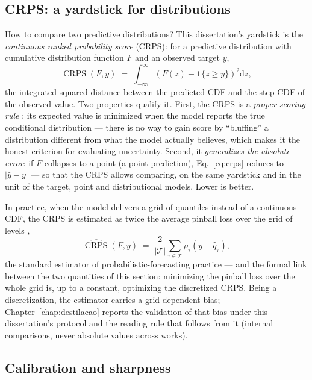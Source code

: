 \subsection{CRPS: a yardstick for distributions}

How to compare two predictive distributions? This dissertation's
yardstick is the \emph{continuous ranked probability score} (CRPS):
for a predictive distribution with cumulative distribution function
$F$ and an observed target $y$,
\begin{equation}
  \operatorname{CRPS}(F, y) \;=\;
  \int_{-\infty}^{\infty}
  \left( F(z) - \mathbf{1}\{z \geq y\} \right)^2 \mathrm{d}z,
  \label{eq:crps}
\end{equation}
the integrated squared distance between the predicted CDF and the
step CDF of the observed value. Two properties qualify it. First,
the CRPS is a \emph{proper scoring rule} \citep{gneiting2007}: its
expected value is minimized when the model reports the true
conditional distribution --- there is no way to gain score by
``bluffing'' a distribution different from what the model actually
believes, which makes it the honest criterion for evaluating
uncertainty. Second, it \emph{generalizes the absolute error}: if
$F$ collapses to a point (a point prediction), Eq.~\ref{eq:crps}
reduces to $|{\hat{y} - y}|$ --- so that the CRPS allows comparing,
on the same yardstick and in the unit of the target, point and
distributional models. Lower is better.

In practice, when the model delivers a grid of quantiles instead of
a continuous CDF, the CRPS is estimated as twice the average pinball
loss over the grid of levels \citep{gneiting2011},
\begin{equation}
  \widehat{\operatorname{CRPS}}(F, y) \;=\;
  \frac{2}{|\mathcal{T}|} \sum_{\tau \in \mathcal{T}}
  \rho_\tau\!\left(y - \hat{q}_\tau\right),
  \label{eq:crps-grade}
\end{equation}
the standard estimator of probabilistic-forecasting practice --- and
the formal link between the two quantities of this section:
minimizing the pinball loss over the whole grid is, up to a
constant, optimizing the discretized CRPS. Being a discretization,
the estimator carries a grid-dependent bias;
Chapter~\ref{chap:destilacao} reports the validation of that bias
under this dissertation's protocol and the reading rule that follows
from it (internal comparisons, never absolute values across works).

\subsection{Calibration and sharpness}

